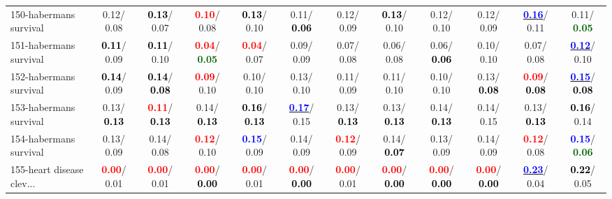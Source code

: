 \begin{table}[h]
\begin{center}
{\begin{tabular}{lc|c|c|c|c|c|c|c|c|c|c}
150-habermans survival &   0.12/  0.08 & \textcolor{black}{\textbf{  0.13}}/  0.07 & \textcolor{red}{\textbf{  0.10}}/  0.08 & \textcolor{black}{\textbf{  0.13}}/  0.10 &   0.11/\textcolor{black}{\textbf{  0.06}} &   0.12/  0.09 & \textcolor{black}{\textbf{  0.13}}/  0.10 &   0.12/  0.10 &   0.12/  0.09 & \underline{\textcolor{blue}{\textbf{  0.16}}}/  0.11 &   0.11/\textcolor{darkgreen}{\textbf{  0.05}} \\
151-habermans survival & \textcolor{black}{\textbf{  0.11}}/  0.09 & \textcolor{black}{\textbf{  0.11}}/  0.10 & \textcolor{red}{\textbf{  0.04}}/\textcolor{darkgreen}{\textbf{  0.05}} & \textcolor{red}{\textbf{  0.04}}/  0.07 &   0.09/  0.09 &   0.07/  0.08 &   0.06/  0.08 &   0.06/\textcolor{black}{\textbf{  0.06}} &   0.10/  0.10 &   0.07/  0.08 & \underline{\textcolor{blue}{\textbf{  0.12}}}/  0.10 \\
152-habermans survival & \textcolor{black}{\textbf{  0.14}}/  0.09 & \textcolor{black}{\textbf{  0.14}}/\textcolor{black}{\textbf{  0.08}} & \textcolor{red}{\textbf{  0.09}}/  0.10 &   0.10/  0.10 &   0.13/  0.10 &   0.11/  0.09 &   0.11/  0.10 &   0.10/  0.10 &   0.13/\textcolor{black}{\textbf{  0.08}} & \textcolor{red}{\textbf{  0.09}}/\textcolor{black}{\textbf{  0.08}} & \underline{\textcolor{blue}{\textbf{  0.15}}}/\textcolor{black}{\textbf{  0.08}} \\
153-habermans survival &   0.13/\textcolor{black}{\textbf{  0.13}} & \textcolor{red}{\textbf{  0.11}}/\textcolor{black}{\textbf{  0.13}} &   0.14/\textcolor{black}{\textbf{  0.13}} & \textcolor{black}{\textbf{  0.16}}/\textcolor{black}{\textbf{  0.13}} & \underline{\textcolor{blue}{\textbf{  0.17}}}/  0.15 &   0.13/\textcolor{black}{\textbf{  0.13}} &   0.13/\textcolor{black}{\textbf{  0.13}} &   0.14/\textcolor{black}{\textbf{  0.13}} &   0.14/  0.15 &   0.13/\textcolor{black}{\textbf{  0.13}} & \textcolor{black}{\textbf{  0.16}}/  0.14 \\
154-habermans survival &   0.13/  0.09 &   0.14/  0.08 & \textcolor{red}{\textbf{  0.12}}/  0.10 & \textcolor{blue}{\textbf{  0.15}}/  0.09 &   0.14/  0.09 & \textcolor{red}{\textbf{  0.12}}/  0.09 &   0.14/\textcolor{black}{\textbf{  0.07}} &   0.13/  0.09 &   0.14/  0.09 & \textcolor{red}{\textbf{  0.12}}/  0.08 & \textcolor{blue}{\textbf{  0.15}}/\textcolor{darkgreen}{\textbf{  0.06}} \\
155-heart disease clev... & \textcolor{red}{\textbf{  0.00}}/  0.01 & \textcolor{red}{\textbf{  0.00}}/  0.01 & \textcolor{red}{\textbf{  0.00}}/\textcolor{black}{\textbf{  0.00}} & \textcolor{red}{\textbf{  0.00}}/  0.01 & \textcolor{red}{\textbf{  0.00}}/\textcolor{black}{\textbf{  0.00}} & \textcolor{red}{\textbf{  0.00}}/  0.01 & \textcolor{red}{\textbf{  0.00}}/\textcolor{black}{\textbf{  0.00}} & \textcolor{red}{\textbf{  0.00}}/\textcolor{black}{\textbf{  0.00}} & \textcolor{red}{\textbf{  0.00}}/\textcolor{black}{\textbf{  0.00}} & \underline{\textcolor{blue}{\textbf{  0.23}}}/  0.04 & \textcolor{black}{\textbf{  0.22}}/  0.05 \\

\end{tabular}}
\end{center}
\end{table}
